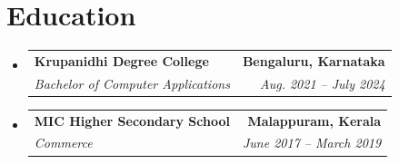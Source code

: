 \documentclass[a4paper,11pt]{article}
\makeatletter
\newcommand{\resumeSubheading}[4]{
	\vspace{-2pt}\item
		\begin{tabular*}{0.97\textwidth}[t]{l@{\extracolsep{\fill}}r}
			\textbf{#1} & \textbf{\small #2} \\
			\textit{\small#3} & \textit{\small #4} \\
		\end{tabular*}\vspace{-7pt}
}
\newcommand{\resumeSubHeadingListStart}{\begin{itemize}[leftmargin=0.15in, label={}]}
\newcommand{\resumeSubHeadingListEnd}{\end{itemize}}
\makeatother
\begin{document}
\section{Education}
\resumeSubHeadingListStart
\resumeSubheading
{Krupanidhi Degree College}{Bengaluru, Karnataka}
{Bachelor of Computer Applications}{Aug. 2021 -- July 2024}
\resumeSubheading
{MIC Higher Secondary School}{Malappuram, Kerala}
{Commerce}{June 2017 -- March 2019}
\resumeSubHeadingListEnd


\end{document}
